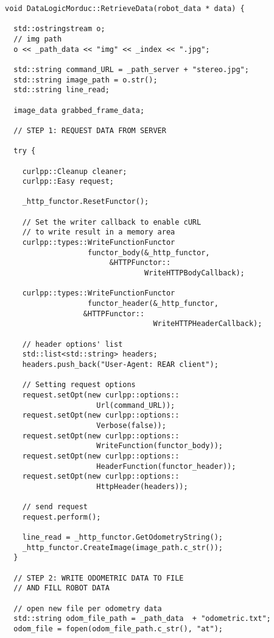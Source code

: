 \begin{lstlisting}[caption={\texttt{DataLogicMorduc::RetrieveData()} method},
    label={code:datalogicmorduc:retrievedata}]
void DataLogicMorduc::RetrieveData(robot_data * data) {

  std::ostringstream o;
  // img path
  o << _path_data << "img" << _index << ".jpg";

  std::string command_URL = _path_server + "stereo.jpg";
  std::string image_path = o.str();
  std::string line_read;

  image_data grabbed_frame_data;
  
  // STEP 1: REQUEST DATA FROM SERVER

  try {

    curlpp::Cleanup cleaner;
    curlpp::Easy request;

    _http_functor.ResetFunctor();
    
    // Set the writer callback to enable cURL 
    // to write result in a memory area
    curlpp::types::WriteFunctionFunctor
                   functor_body(&_http_functor, 
		                &HTTPFunctor::
                                WriteHTTPBodyCallback);
      
    curlpp::types::WriteFunctionFunctor
                   functor_header(&_http_functor, 
				  &HTTPFunctor::
                                  WriteHTTPHeaderCallback);
    
    // header options' list
    std::list<std::string> headers;
    headers.push_back("User-Agent: REAR client"); 
      
    // Setting request options
    request.setOpt(new curlpp::options::
                     Url(command_URL));
    request.setOpt(new curlpp::options::
                     Verbose(false));
    request.setOpt(new curlpp::options::
                     WriteFunction(functor_body));
    request.setOpt(new curlpp::options::
                     HeaderFunction(functor_header));
    request.setOpt(new curlpp::options::
                     HttpHeader(headers));
        
    // send request
    request.perform();
      
    line_read = _http_functor.GetOdometryString();
    _http_functor.CreateImage(image_path.c_str());
  }
  
  // STEP 2: WRITE ODOMETRIC DATA TO FILE
  // AND FILL ROBOT DATA
  
  // open new file per odometry data
  std::string odom_file_path = _path_data  + "odometric.txt";
  odom_file = fopen(odom_file_path.c_str(), "at");  


\end{lstlisting}
